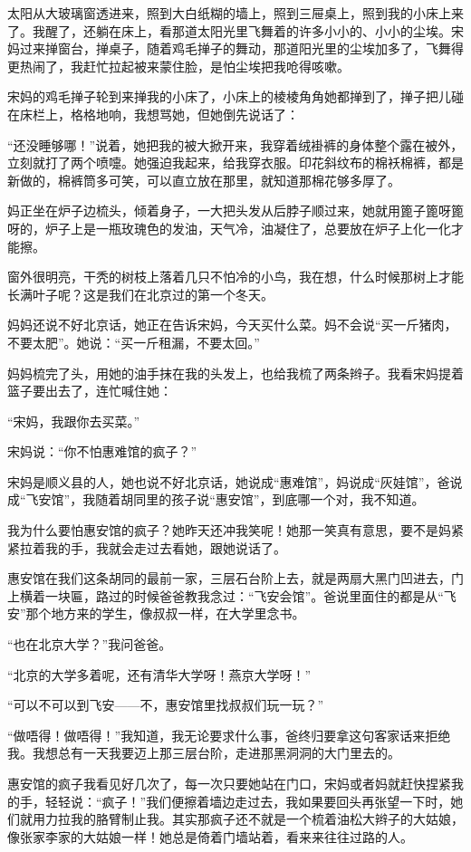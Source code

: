 \par 太阳从大玻璃窗透进来，照到大白纸糊的墙上，照到三屉桌上，照到我的小床上来了。我醒了，还躺在床上，看那道太阳光里飞舞着的许多小小的、小小的尘埃。宋妈过来掸窗台，掸桌子，随着鸡毛掸子的舞动，那道阳光里的尘埃加多了，飞舞得更热闹了，我赶忙拉起被来蒙住脸，是怕尘埃把我呛得咳嗽。
\par 宋妈的鸡毛掸子轮到来掸我的小床了，小床上的棱棱角角她都掸到了，掸子把儿碰在床栏上，格格地响，我想骂她，但她倒先说话了：
\par “还没睡够哪！”说着，她把我的被大掀开来，我穿着绒褂裤的身体整个露在被外，立刻就打了两个喷嚏。她强迫我起来，给我穿衣服。印花斜纹布的棉袄棉裤，都是新做的，棉裤筒多可笑，可以直立放在那里，就知道那棉花够多厚了。
\par 妈正坐在炉子边梳头，倾着身子，一大把头发从后脖子顺过来，她就用篦子篦呀篦呀的，炉子上是一瓶玫瑰色的发油，天气冷，油凝住了，总要放在炉子上化一化才能擦。
\par 窗外很明亮，干秃的树枝上落着几只不怕冷的小鸟，我在想，什么时候那树上才能长满叶子呢？这是我们在北京过的第一个冬天。
\par 妈妈还说不好北京话，她正在告诉宋妈，今天买什么菜。妈不会说“买一斤猪肉，不要太肥”。她说：“买一斤租漏，不要太回。”
\par 妈妈梳完了头，用她的油手抹在我的头发上，也给我梳了两条辫子。我看宋妈提着篮子要出去了，连忙喊住她：
\par “宋妈，我跟你去买菜。”
\par 宋妈说：“你不怕惠难馆的疯子？”
\par 宋妈是顺义县的人，她也说不好北京话，她说成“惠难馆”，妈说成“灰娃馆”，爸说成“飞安馆”，我随着胡同里的孩子说“惠安馆”，到底哪一个对，我不知道。
\par 我为什么要怕惠安馆的疯子？她昨天还冲我笑呢！她那一笑真有意思，要不是妈紧紧拉着我的手，我就会走过去看她，跟她说话了。
\par 惠安馆在我们这条胡同的最前一家，三层石台阶上去，就是两扇大黑门凹进去，门上横着一块匾，路过的时候爸爸教我念过：“飞安会馆”。爸说里面住的都是从“飞安”那个地方来的学生，像叔叔一样，在大学里念书。
\par “也在北京大学？”我问爸爸。
\par “北京的大学多着呢，还有清华大学呀！燕京大学呀！”
\par “可以不可以到飞安——不，惠安馆里找叔叔们玩一玩？”
\par “做唔得！做唔得！”我知道，我无论要求什么事，爸终归要拿这句客家话来拒绝我。我想总有一天我要迈上那三层台阶，走进那黑洞洞的大门里去的。
\par 惠安馆的疯子我看见好几次了，每一次只要她站在门口，宋妈或者妈就赶快捏紧我的手，轻轻说：“疯子！”我们便擦着墙边走过去，我如果要回头再张望一下时，她们就用力拉我的胳臂制止我。其实那疯子还不就是一个梳着油松大辫子的大姑娘，像张家李家的大姑娘一样！她总是倚着门墙站着，看来来往往过路的人。
